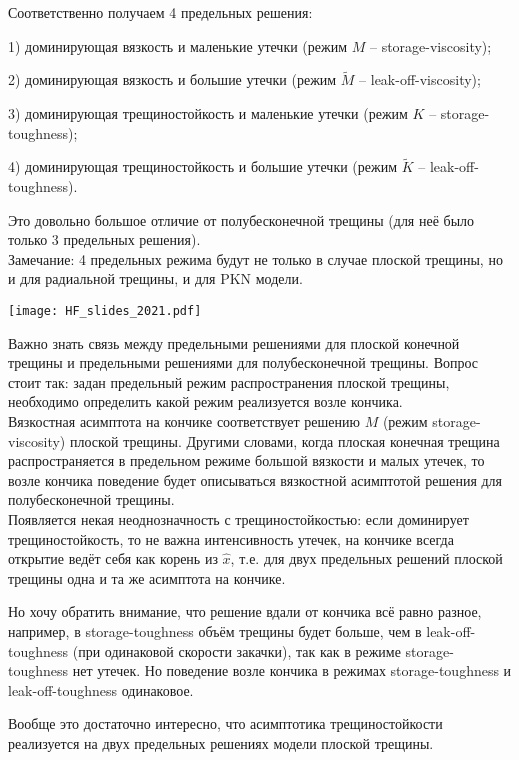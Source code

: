 \documentclass[main.tex]{subfiles}
\begin{document}
Соответственно получаем 4 предельных решения:

1) доминирующая вязкость и маленькие утечки (режим $M$ -- storage-viscosity);

2) доминирующая вязкость и большие утечки (режим $\tilde{M}$ -- leak-off-viscosity);

3) доминирующая трещиностойкость и маленькие утечки (режим $K$ -- storage-toughness);

4) доминирующая трещиностойкость и большие утечки (режим $\tilde{K}$ -- leak-off-toughness).

Это довольно большое отличие от полубесконечной трещины (для неё было только 3 предельных решения).
\\

Замечание: 4 предельных режима будут не только в случае плоской трещины, но и для радиальной трещины, и для PKN модели.

\texttt{[image: HF\_slides\_2021.pdf]}

Важно знать связь между предельными решениями для плоской конечной трещины и предельными решениями для полубесконечной трещины.
Вопрос стоит так: задан предельный режим распространения плоской трещины, необходимо определить какой режим реализуется возле кончика.
\\

Вязкостная асимптота на кончике соответствует решению $M$ (режим storage-viscosity) плоской трещины.
Другими словами, когда плоская конечная трещина распространяется в предельном режиме большой вязкости и малых утечек, то возле кончика поведение будет описываться вязкостной асимптотой решения для полубесконечной трещины.
\\

Появляется некая неоднозначность с трещиностойкостью: если доминирует трещиностойкость, то не важна интенсивность утечек, на кончике всегда открытие ведёт себя как корень из $\hat{x}$, т.е. для двух предельных решений плоской трещины одна и та же асимптота на кончике.

Но хочу обратить внимание, что решение вдали от кончика всё равно разное, например, в storage-toughness объём трещины будет больше, чем в leak-off-toughness (при одинаковой скорости закачки), так как в режиме storage-toughness нет утечек.
Но поведение возле кончика в режимах storage-toughness и  leak-off-toughness одинаковое.

Вообще это достаточно интересно, что асимптотика трещиностойкости реализуется на двух предельных решениях модели плоской трещины.
\\
\end{document}
